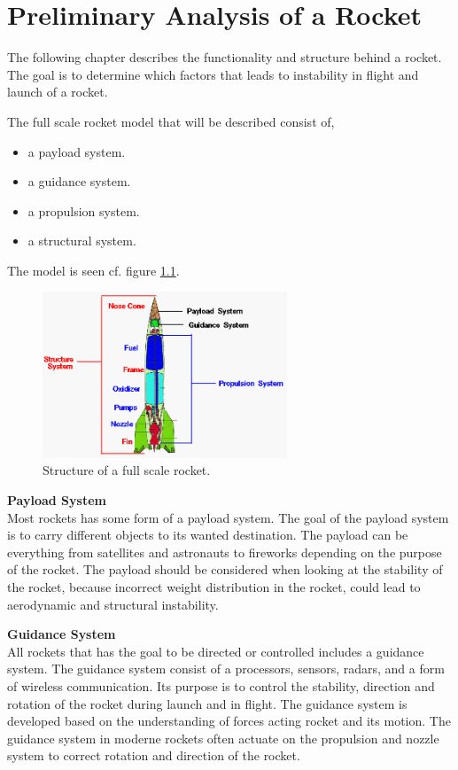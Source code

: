 \chapter{Preliminary Analysis of a Rocket}
The following chapter describes the functionality and structure behind a rocket. The goal is to determine which factors that leads to instability in flight and launch of a rocket. 



The full scale rocket model that will be described consist of,
\begin{itemize}[noitemsep]
\item a payload system.
\item a guidance system.
\item a propulsion system. 
\item a structural system.
\end{itemize}    
The model is seen cf. figure \ref{fig:RocketStructure}.
\begin{figure}[htbp]
	\centering
 	\includegraphics[width=0.65\textwidth]{figures/RocketStructure.png} 
 	\caption{Structure of a full scale rocket\cite{web:RocketStructure}.}
 	\label{fig:RocketStructure}
\end{figure}

\textbf{Payload System}\\
Most rockets has some form of a payload system. The goal of the payload system is to carry different objects to its wanted destination. The payload can be everything from satellites and astronauts to fireworks depending on the purpose of the rocket. The payload should be considered when looking at the stability of the rocket, because incorrect weight distribution in the rocket, could lead to aerodynamic and structural instability. 


\textbf{Guidance System}\\
All rockets that has the goal to be directed or controlled includes a guidance system. The guidance system consist of a processors, sensors, radars, and  a form of wireless communication. Its purpose is to control the stability, direction and rotation of the rocket during launch and in flight. The guidance system is developed based on the understanding of forces acting rocket and its motion. The guidance system in moderne rockets often actuate on the propulsion and nozzle system to correct rotation and direction of the rocket.

